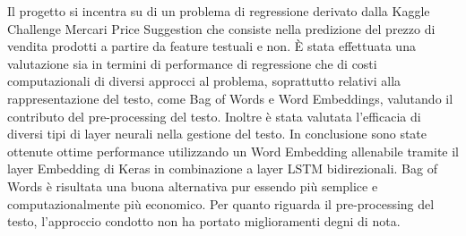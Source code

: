 
Il progetto si incentra su di un problema di regressione derivato dalla Kaggle
Challenge Mercari Price Suggestion che consiste nella predizione del prezzo di
vendita prodotti a partire da feature testuali e non. È stata effettuata una
valutazione sia in termini di performance di regressione che di costi
computazionali di diversi approcci al problema, soprattutto relativi alla
rappresentazione del testo, come Bag of Words e Word Embeddings, valutando il
contributo del pre-processing del testo. Inoltre è stata valutata l'efficacia di
diversi tipi di layer neurali nella gestione del testo. In conclusione sono
state ottenute ottime performance utilizzando un Word Embedding allenabile
tramite il layer Embedding di Keras in combinazione a layer LSTM bidirezionali.
Bag of Words è risultata una buona alternativa pur essendo più semplice e
computazionalmente più economico. Per quanto riguarda il pre-processing del
testo, l'approccio condotto non ha portato miglioramenti degni di nota.